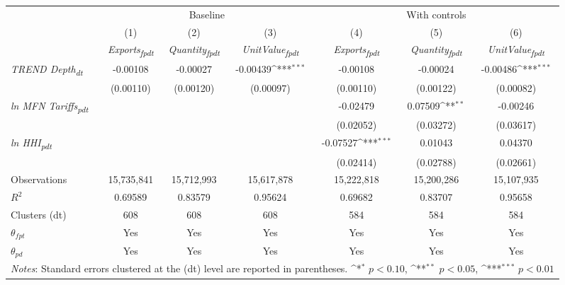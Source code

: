 {
\def\sym#1{\ifmmode^{#1}\else\(^{#1}\)\fi}
\begin{tabular}{l*{6}{c}}
\toprule
&\multicolumn{3}{c}{Baseline}&\multicolumn{3}{c}{With controls}\\\cmidrule(lr){2-4}\cmidrule(lr){5-7}
&(1)&(2)&(3)&(4)&(5)&(6)\\
&\textit{Exports\textsubscript{fpdt}}&\textit{Quantity\textsubscript{fpdt}}&\textit{UnitValue\textsubscript{fpdt}}&\textit{Exports\textsubscript{fpdt}}&\textit{Quantity\textsubscript{fpdt}}&\textit{UnitValue\textsubscript{fpdt}}\\
\midrule
\textit{TREND Depth\textsubscript{dt}} & -0.00108 & -0.00027 & -0.00439\sym{***} & -0.00108 & -0.00024 & -0.00486\sym{***}\\
 & (0.00110) & (0.00120) & (0.00097) & (0.00110) & (0.00122) & (0.00082)\\
\addlinespace
\textit{ln MFN Tariffs\textsubscript{pdt}} &  &  &  & -0.02479 & 0.07509\sym{**} & -0.00246\\
 &  &  &  & (0.02052) & (0.03272) & (0.03617)\\
\addlinespace
\textit{ln HHI\textsubscript{pdt}} &  &  &  & -0.07527\sym{***} & 0.01043 & 0.04370\\
 &  &  &  & (0.02414) & (0.02788) & (0.02661)\\
\midrule
Observations & 15,735,841 & 15,712,993 & 15,617,878 & 15,222,818 & 15,200,286 & 15,107,935\\
$R^{2}$ & 0.69589 & 0.83579 & 0.95624 & 0.69682 & 0.83707 & 0.95658\\
Clusters (dt) & 608 & 608 & 608 & 584 & 584 & 584\\
$\theta_{fpt}$ & Yes & Yes & Yes & Yes & Yes & Yes\\
$\theta_{pd}$ & Yes & Yes & Yes & Yes & Yes & Yes\\
\bottomrule
\multicolumn{7}{l}{\footnotesize \textit{Notes}: Standard errors clustered at the (dt) level are reported in parentheses. \sym{*} \(p<0.10\), \sym{**} \(p<0.05\), \sym{***} \(p<0.01\)}\\
\end{tabular}
}
